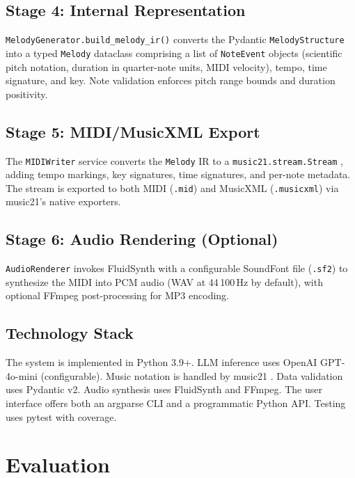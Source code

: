 \documentclass[conference]{IEEEtran}
\begin{document}
\subsection{Stage 4: Internal Representation}

\texttt{MelodyGenerator.build\_melody\_ir()} converts the Pydantic
\texttt{MelodyStructure} into a typed \texttt{Melody} dataclass comprising a
list of \texttt{NoteEvent} objects (scientific pitch notation, duration in
quarter-note units, MIDI velocity), tempo, time signature, and key. Note
validation enforces pitch range bounds and duration positivity.

\subsection{Stage 5: MIDI/MusicXML Export}

The \texttt{MIDIWriter} service converts the \texttt{Melody} IR to a
\texttt{music21.stream.Stream} \cite{cuthbert2010}, adding tempo markings, key
signatures, time signatures, and per-note metadata. The stream is exported to
both MIDI (\texttt{.mid}) and MusicXML (\texttt{.musicxml}) via music21's
native exporters.

\subsection{Stage 6: Audio Rendering (Optional)}

\texttt{AudioRenderer} invokes FluidSynth with a configurable SoundFont file
(\texttt{.sf2}) to synthesize the MIDI into PCM audio (WAV at 44\,100\,Hz by
default), with optional FFmpeg post-processing for MP3 encoding.

\subsection{Technology Stack}

The system is implemented in Python 3.9+. LLM inference uses OpenAI
GPT-4o-mini \cite{openai2024} (configurable). Music notation is handled by
music21 \cite{cuthbert2010}. Data validation uses Pydantic v2. Audio synthesis
uses FluidSynth and FFmpeg. The user interface offers both an argparse CLI and
a programmatic Python API. Testing uses pytest with coverage.

\section{Evaluation}
\end{document}
